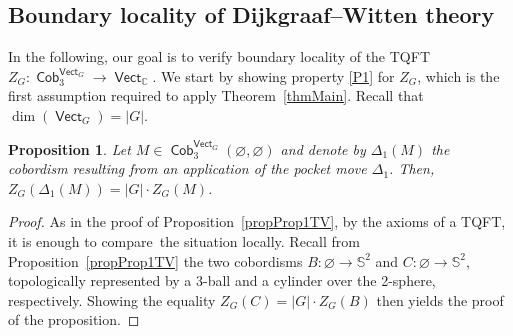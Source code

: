 \documentclass[pdftex]{sigma}
\DeclareMathOperator{\vect}{\mathsf{Vect}}
\DeclareMathOperator{\C}{\mathbb{C}}
\DeclareMathOperator{\Cob}{\mathsf{Cob}}
\numberwithin{equation}{section}
\newtheorem{Proposition}[Proposition]{Proposition}
\theoremstyle{definition}
\begin{document}
\subsection{Boundary locality of Dijkgraaf--Witten theory}
\label{subSecDWProp}
In the following, our goal is to verify boundary locality of the TQFT $Z_G\colon \Cob_3^{\vect_G} \rightarrow \vect_{\C}$. We start by showing property \ref{P1} for $Z_G$, which is the first assumption required to apply Theorem~\ref{thmMain}. Recall that $\dim (\vect_G) = |G|$.
\begin{Proposition}
 \label{propDW1}
 Let $M \in \Cob_3^{\vect_G}(\varnothing, \varnothing)$ and denote by $\Delta_1(M)$ the cobordism resulting from an application of the pocket move $\Delta_1$. Then, $Z_G(\Delta_1(M)) = |G| \cdot Z_G(M)$.
\end{Proposition}
\begin{proof}
 As in the proof of Proposition~\ref{propProp1TV}, by the axioms of a TQFT, it is enough to compare~the situation locally. Recall from Proposition~\ref{propProp1TV} the two cobordisms $B\colon \varnothing \rightarrow \mathbb{S}^2$ and $C\colon \varnothing \rightarrow \mathbb{S}^2$, topologically represented by a 3-ball and a cylinder over the 2-sphere, respectively. Showing the equality $Z_G(C) = |G|\cdot Z_G(B)$ then yields the proof of the proposition.


\end{proof}
\end{document}
